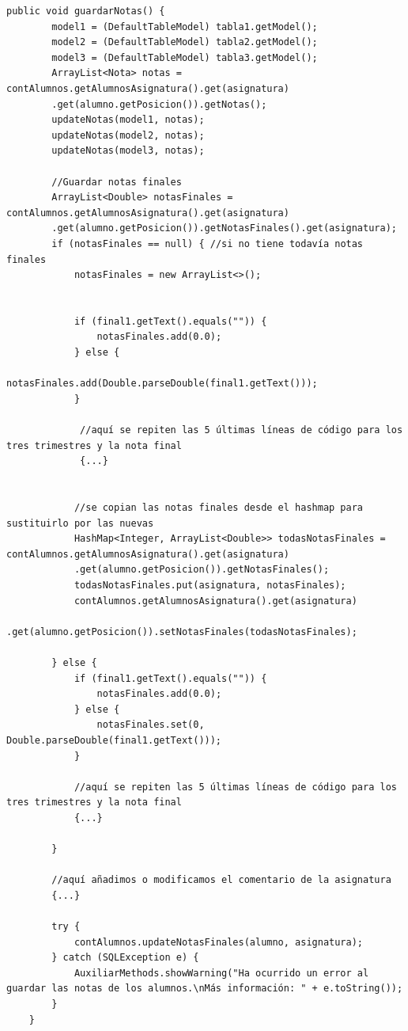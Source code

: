\begin{lstlisting}
public void guardarNotas() {
        model1 = (DefaultTableModel) tabla1.getModel();
        model2 = (DefaultTableModel) tabla2.getModel();
        model3 = (DefaultTableModel) tabla3.getModel();
        ArrayList<Nota> notas = contAlumnos.getAlumnosAsignatura().get(asignatura)
        .get(alumno.getPosicion()).getNotas();
        updateNotas(model1, notas);
        updateNotas(model2, notas);
        updateNotas(model3, notas);

        //Guardar notas finales
        ArrayList<Double> notasFinales = contAlumnos.getAlumnosAsignatura().get(asignatura)
        .get(alumno.getPosicion()).getNotasFinales().get(asignatura);
        if (notasFinales == null) { //si no tiene todavía notas finales
            notasFinales = new ArrayList<>();
            
            
            if (final1.getText().equals("")) {
                notasFinales.add(0.0);
            } else {
                notasFinales.add(Double.parseDouble(final1.getText()));
            }
            
             //aquí se repiten las 5 últimas líneas de código para los tres trimestres y la nota final
             {...}

            
            //se copian las notas finales desde el hashmap para sustituirlo por las nuevas
            HashMap<Integer, ArrayList<Double>> todasNotasFinales = contAlumnos.getAlumnosAsignatura().get(asignatura)
            .get(alumno.getPosicion()).getNotasFinales();
            todasNotasFinales.put(asignatura, notasFinales);
            contAlumnos.getAlumnosAsignatura().get(asignatura)
            .get(alumno.getPosicion()).setNotasFinales(todasNotasFinales);

        } else {
            if (final1.getText().equals("")) {
                notasFinales.add(0.0);
            } else {
                notasFinales.set(0, Double.parseDouble(final1.getText()));
            }

            //aquí se repiten las 5 últimas líneas de código para los tres trimestres y la nota final
            {...}
            
        }

        //aquí añadimos o modificamos el comentario de la asignatura
        {...}

        try {
            contAlumnos.updateNotasFinales(alumno, asignatura);
        } catch (SQLException e) {
            AuxiliarMethods.showWarning("Ha ocurrido un error al guardar las notas de los alumnos.\nMás información: " + e.toString());
        }
    }
\end{lstlisting}

